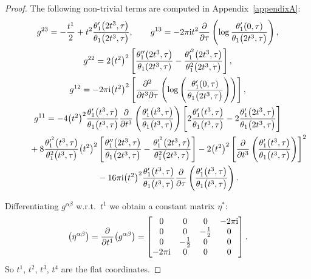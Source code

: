\documentclass[pdftex]{sigma}%
\numberwithin{equation}{section}
\begin{document}
\begin{proof}
The following non-trivial terms are computed in Appendix~\ref{appendixA}:
\begin{gather}
g^{23}=-\frac{t^1}{2}+t^2\frac{\theta_1^{\prime}\big(2t^3,\tau\big)}{\theta_1\big(2t^3,\tau\big)},
\qquad
g^{13}=-2\pi {\rm i} t^2 \frac{\partial}{\partial \tau}\left(\log\frac{\theta_1^{\prime}(0,\tau)}{\theta_1\big(2t^3,\tau\big)}\right),\nonumber
\\
g^{22}=2\big(t^2\big)^2\left[\frac{\theta_1^{\prime\prime}\big(2t^3,\tau\big)} {\theta_1(2t^3,\tau)}-\frac{\theta_1^{\prime^2}\big(2t^3,\tau\big)} {\theta_1^2\big(2t^3,\tau\big)}\right],\nonumber
\\
g^{12}=-2\pi {\rm i}\big(t^2\big)^2\left[\frac{\partial^2}{\partial t^3\partial \tau}\left( \log\left(\frac{\theta_1^{\prime}(0,\tau)}{\theta_1\big(2t^3,\tau\big)}\right)\right)\right],
\label{g23}
\\
g^{11}=-4\big(t^2\big)^2\frac{\theta_1^{\prime}\big(t^3,\tau\big)}{\theta_1\big(t^3,\tau\big)}\frac{\partial} {\partial t^3}\left(\frac{\theta_1^{\prime}\big(t^3,\tau\big)}{\theta_1\big(t^3,\tau\big)}\right)\left[ 2\frac{\theta_1^{\prime}\big(t^3,\tau\big)}{\theta_1\big(t^3,\tau\big)} -2\frac{\theta_1^{\prime}\big(2t^3,\tau\big)}{\theta_1\big(2t^3,\tau\big)}\right]\nonumber
\\ \hphantom{g^{11}=}
{}+8\frac{\theta_1^{\prime^2}\big(t^3,\tau\big)}{\theta_1^2\big(t^3,\tau\big)}\big(t^2\big)^2 \left[\frac{\theta_1^{\prime\prime}\big(2t^3,\tau\big)}{\theta_1\big(2t^3,\tau\big)} -\frac{\theta_1^{\prime^2}\big(2t^3,\tau\big)}{\theta_1^2\big(2t^3,\tau\big)}\right]
-2\big(t^2\big)^2\left[\frac{\partial}{\partial t^3}\left(\frac{\theta_1^{\prime}\big(t^3,\tau\big)}{\theta_1\big(t^3,\tau\big)}\right)\right]^2\nonumber
\\ \hphantom{g^{11}=}
{}-16\pi {\rm i}\big(t^2\big)^2\frac{\theta_1^{\prime}\big(t^3,\tau\big)}{\theta_1\big(t^3,\tau\big)} \frac{\partial}{\partial \tau}\left(\frac{\theta_1^{\prime}\big(t^3,\tau\big)}{\theta_1\big(t^3,\tau\big)}\right).\label{g11}
\end{gather}

Differentiating $g^{\alpha\beta}$ w.r.t.\ $t^1$ we obtain a constant matrix $\eta^{*}$:
\[
\big(\eta^{\alpha\beta}\big)=\frac{\partial}{\partial t^1}\big(g^{\alpha\beta}\big)=
\begin{bmatrix}
 0 & 0 & 0 &-2\pi {\rm i} \\
 0 & 0 &-\frac{1}{2} &0 \\
 0& -\frac{1}{2} &0 & 0 \\
 -2\pi {\rm i} & 0 & 0 &0
\end{bmatrix}.
\]
So $t^1$, $t^2$, $t^3$, $t^4$ are the flat coordinates.


\end{proof}
\end{document}
